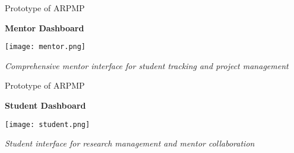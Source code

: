 \documentclass[aspectratio=169]{beamer}
\begin{document}
\begin{frame}{Prototype of ARPMP}
\begin{center}
\textbf{\Large Mentor Dashboard}
\end{center}

\vspace{0.2cm}

\begin{center}
\texttt{[image: mentor.png]}
\end{center}

\vspace{0.3cm}

\begin{center}
\textit{Comprehensive mentor interface for student tracking and project management}
\end{center}

\end{frame}

\begin{frame}{Prototype of ARPMP}
\begin{center}
\textbf{\Large Student Dashboard}
\end{center}

\vspace{0.2cm}

\begin{center}
\texttt{[image: student.png]}
\end{center}

\vspace{0.3cm}

\begin{center}
\textit{Student interface for research management and mentor collaboration}
\end{center}

\end{frame}
\end{document}
